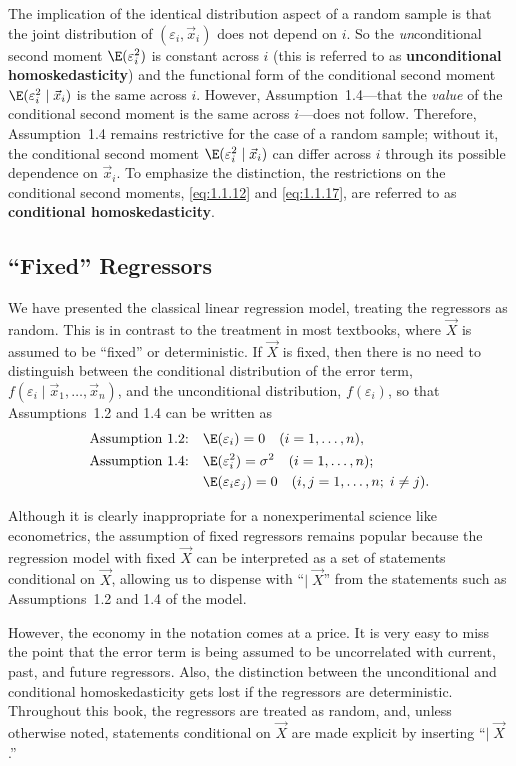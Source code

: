 The implication of the identical distribution aspect of a random sample is that
the joint distribution of $(\varepsilon_i, \vec{x}_i)$ does not depend on $i$.
So the \emph{un}conditional second moment $\E(\varepsilon_i^{2})$ is constant
across $i$ (this is referred to as \textbf{unconditional homoskedasticity})
and the functional form of the conditional second moment
$\E(\varepsilon_i^{2} \mid \vec{x}_i)$ is the same across $i$.  However,
Assumption~1.4---that the \emph{value} of the conditional second moment is the
same across $i$---does not follow.  Therefore, Assumption~1.4 remains
restrictive for the case of a random sample; without it, the conditional second
moment $\E(\varepsilon_i^{2} \mid \vec{x}_i)$ can differ across $i$ through
its possible dependence on $\vec{x}_i$.  To emphasize the distinction, the
restrictions on the conditional second moments, \eqref{eq:1.1.12} and
\eqref{eq:1.1.17}, are referred to as \textbf{conditional homoskedasticity}.

\subsection*{``Fixed'' Regressors}

We have presented the classical linear regression model, treating the
regressors as random.  This is in contrast to the treatment in most textbooks,
where $\vec{X}$ is assumed to be ``fixed'' or deterministic.  If $\vec{X}$ is
fixed, then there is no need to distinguish between the conditional
distribution of the error term, $f(\varepsilon_i \mid \vec{x}_1, \ldots,
\vec{x}_n)$, and the unconditional distribution, $f(\varepsilon_i)$, so that
Assumptions~1.2 and 1.4 can be written as
\begin{align}
  \text{Assumption 1.2:}\quad
    & \E(\varepsilon_i) = 0
      \quad (i = 1, \ldots, n),
    \label{eq:1.1.18} \\
  \text{Assumption 1.4:}\quad
    & \E(\varepsilon_i^{2}) = \sigma^{2}
      \quad (i = 1, \ldots, n); \notag \\
    & \E(\varepsilon_i \varepsilon_j) = 0
      \quad (i, j = 1, \ldots, n;\; i \neq j).
    \label{eq:1.1.19}
\end{align}

Although it is clearly inappropriate for a nonexperimental science like
econometrics, the assumption of fixed regressors remains popular because the
regression model with fixed $\vec{X}$ can be interpreted as a set of statements
conditional on $\vec{X}$, allowing us to dispense with ``$\mid\;\vec{X}$''
from the statements such as Assumptions~1.2 and 1.4 of the model.

However, the economy in the notation comes at a price.  It is very easy to miss
the point that the error term is being assumed to be uncorrelated with current,
past, and future regressors.  Also, the distinction between the unconditional
and conditional homoskedasticity gets lost if the regressors are deterministic.
Throughout this book, the regressors are treated as random, and, unless
otherwise noted, statements conditional on $\vec{X}$ are made explicit by
inserting ``$\mid\;\vec{X}$.''
